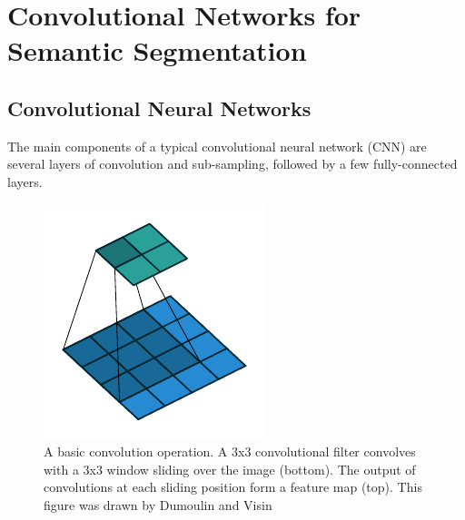 \appendix



\section{Convolutional Networks for Semantic Segmentation}

\subsection{Convolutional Neural Networks}


The main components of a typical convolutional neural network (CNN) are several layers of convolution and sub-sampling, followed by a few fully-connected layers.

\begin{figure}[t]
\centering
   \includegraphics[width=\linewidth]{img/no_padding_no_strides_00.pdf}
\caption{
A basic convolution operation.
A 3x3 convolutional filter convolves with a 3x3 window sliding over the image (bottom).
The output of convolutions at each sliding position form a feature map (top).
This figure was drawn by Dumoulin and Visin \cite{dumoulin2016guide}
}
\label{fig:conv}
\end{figure}

